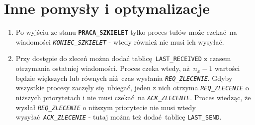 \documentclass[12pt]{article}
\newcommand{\state}[1]{\texttt{\textbf{#1}}}
\newcommand{\msg}[1]{\texttt{\emph{#1}}}
\newcommand{\var}[1]{\texttt{#1}}
\begin{document}
\section{Inne pomysły i optymalizacje}
\begin{enumerate}
	\item Po wyjściu ze stanu \state{PRACA\_SZKIELET} tylko proces-tułów może czekać na wiadomości \msg{KONIEC\_SZKIELET} - wtedy również nie musi ich wysyłać.
	\item Przy dostępie do zleceń można dodać tablicę \var{LAST\_RECEIVED} z czasem otrzymania ostatniej wiadomości. Proces czeka wtedy, aż $n_x - 1$ wartości będzie większych lub równych niż czas wysłania \msg{REQ\_ZLECENIE}. Gdyby wszystkie procesy zaczęły się ubiegać, jeden z nich otrzyma \msg{REQ\_ZLECENIE} o niższych priorytetach i nie musi czekać na \msg{ACK\_ZLECENIE}. Proces wiedząc, że wysłał \msg{REQ\_ZLECENIE} o niższym priorytecie nie musi wtedy wysyłać \msg{ACK\_ZLECENIE} - tutaj można też dodać tablicę \var{LAST\_SEND}.
\end{enumerate}
\end{document}
